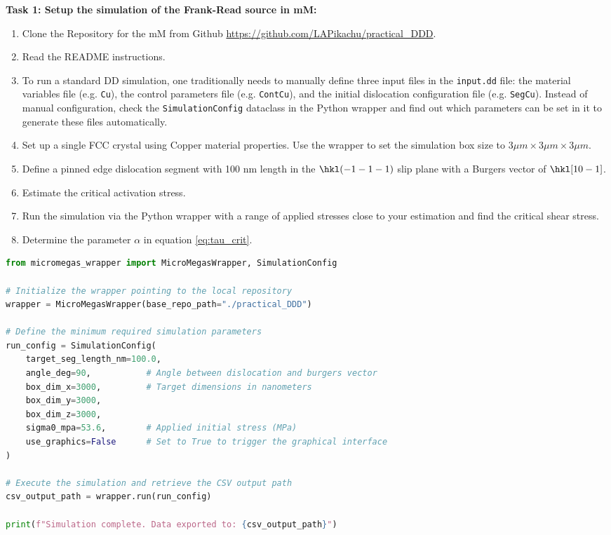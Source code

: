 \begin{tcolorbox}[colback=white,colframe=black,sharp corners,boxrule=0.5pt]
\textbf{\hypertarget{task1}{Task 1: Setup the simulation of the Frank-Read source in mM:}}
\label{task:one}
\begin{enumerate}
    \item Clone the Repository for the mM from Github \url{https://github.com/LAPikachu/practical_DDD}.
    \item Read the README instructions.
    \item To run a standard DD simulation, one traditionally needs to manually define three input files in the \texttt{input.dd} file: the material variables file (e.g. \texttt{Cu}), the control parameters file (e.g. \texttt{ContCu}), and the initial dislocation configuration file (e.g. \texttt{SegCu}). Instead of manual configuration, check the \texttt{SimulationConfig} dataclass in the Python wrapper and find out which parameters can be set in it to generate these files automatically.
    \item Set up a single FCC crystal using Copper material properties. Use the wrapper to set the simulation box size to $3 \mu m \times 3 \mu m \times 3 \mu m$.
    \item Define a pinned edge dislocation segment with 100 nm length in the $\hkl(-1-1-1)$ slip plane with a Burgers vector of   $\hkl[10-1]$.
    \item Estimate the critical activation stress.
    \item Run the simulation via the Python wrapper with a range of applied stresses close to your estimation and find the critical shear stress.
    \item Determine the parameter $\alpha$ in equation \ref{eq:tau_crit}.
\end{enumerate}

\begin{lstlisting}[language=Python, caption=Minimal microMegas Python Wrapper Implementation]
from micromegas_wrapper import MicroMegasWrapper, SimulationConfig

# Initialize the wrapper pointing to the local repository
wrapper = MicroMegasWrapper(base_repo_path="./practical_DDD")

# Define the minimum required simulation parameters
run_config = SimulationConfig(
    target_seg_length_nm=100.0,
    angle_deg=90,           # Angle between dislocation and burgers vector
    box_dim_x=3000,         # Target dimensions in nanometers
    box_dim_y=3000,         
    box_dim_z=3000,         
    sigma0_mpa=53.6,        # Applied initial stress (MPa)
    use_graphics=False      # Set to True to trigger the graphical interface
)

# Execute the simulation and retrieve the CSV output path
csv_output_path = wrapper.run(run_config)

print(f"Simulation complete. Data exported to: {csv_output_path}")
\end{lstlisting}

\end{tcolorbox}

